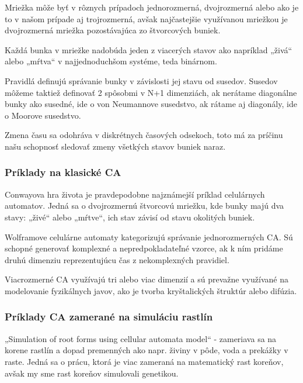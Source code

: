 \documentclass[12pt]{article}
\begin{document}
Mriežka môže byť v rôznych prípadoch jednorozmerná, dvojrozmerná alebo ako je
to v našom prípade aj trojrozmerná,
avšak najčastejšie využívanou mriežkou je
dvojrozmerná mriežka pozostávajúca zo štvorcových buniek.

Každá bunka v mriežke nadobúda jeden z viacerých stavov ako napríklad „živá“
alebo „mŕtva“ v najjednoduchšom systéme, teda binárnom.

Pravidlá definujú správanie bunky v závislosti jej stavu od susedov. Susedov
môžeme taktiež definovať 2 spôsobmi v N+1 dimenziách, ak nerátame diagonálne
bunky ako susedné, ide o von Neumannove susedstvo, ak rátame aj diagonály,
ide o Moorove susedstvo. %

Zmena času sa odohráva v diskrétnych časových odsekoch, toto má za príčinu
našu schopnosť sledovať zmeny všetkých stavov buniek naraz.

\subsubsection{Príklady na klasické CA}

Conwayova hra života je pravdepodobne najznámejší príklad celulárnych
automatov. Jedná sa o dvojrozmernú štvorcovú mriežku, kde bunky majú dva stavy:
„živé“ alebo „mŕtve“, ich stav závisí od stavu okolitých buniek.

Wolframove celulárne automaty kategorizujú správanie jednorozmerných CA.
Sú schopné generovať komplexné a nepredpokladateľné vzorce, ak k ním pridáme
druhú dimenziu reprezentujúcu čas z nekomplexných pravidiel.

Viacrozmerné CA využívajú tri alebo viac dimenzií a sú prevažne využívané
na modelovanie fyzikálnych javov, ako je tvorba kryštalických štruktúr
alebo difúzia. %

\subsubsection{Príklady CA zamerané na simuláciu rastlín}

„Simulation of root forms using cellular automata model“ - zameriava sa na
korene rastlín a dopad premenných ako napr. živiny v pôde, voda a prekážky
v raste. Jedná sa o prácu, ktorá je viac zameraná na matematický rast koreňov,
avšak my sme rast koreňov simulovali genetikou.
\end{document}
